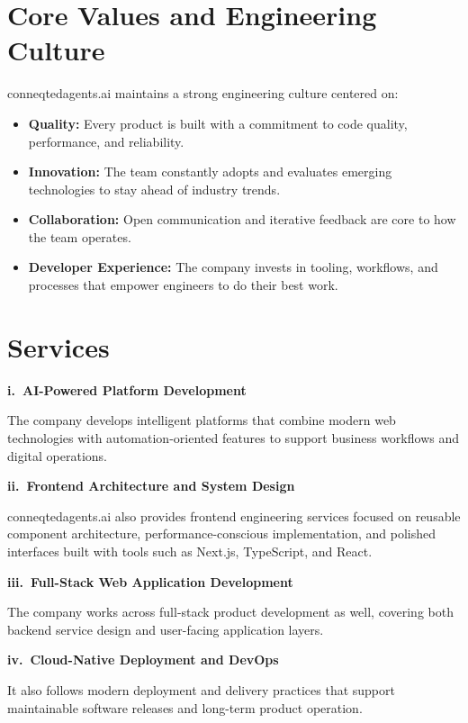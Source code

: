 \documentclass[12pt, oneside, a4paper]{book}
\begin{document}
\begin{doublespace}
\section{Core Values and Engineering Culture}

conneqtedagents.ai maintains a strong engineering culture centered on:

\begin{itemize}
  \item \textbf{Quality:} Every product is built with a commitment to code quality,
  performance, and reliability.
  \item \textbf{Innovation:} The team constantly adopts and evaluates emerging
  technologies to stay ahead of industry trends.
  \item \textbf{Collaboration:} Open communication and iterative feedback are core
  to how the team operates.
  \item \textbf{Developer Experience:} The company invests in tooling, workflows, and
  processes that empower engineers to do their best work.
\end{itemize}

\section{Services}

\noindent\textbf{i.\ AI-Powered Platform Development}

The company develops intelligent platforms that combine modern web technologies with
automation-oriented features to support business workflows and digital operations.

\noindent\textbf{ii.\ Frontend Architecture and System Design}

conneqtedagents.ai also provides frontend engineering services focused on reusable
component architecture, performance-conscious implementation, and polished interfaces
built with tools such as Next.js, TypeScript, and React.

\noindent\textbf{iii.\ Full-Stack Web Application Development}

The company works across full-stack product development as well, covering both backend
service design and user-facing application layers.

\noindent\textbf{iv.\ Cloud-Native Deployment and DevOps}

It also follows modern deployment and delivery practices that support maintainable
software releases and long-term product operation.


\end{doublespace}
\end{document}
